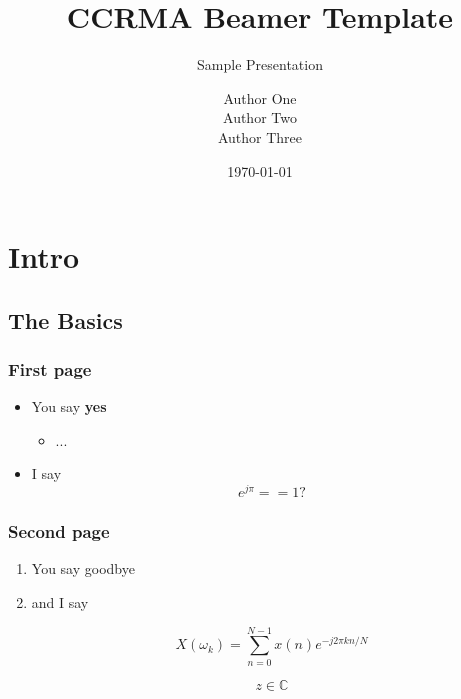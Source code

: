 \documentclass{beamer}
\title{CCRMA Beamer Template}
\subtitle{Sample Presentation}
\author{Author One \\ Author Two \\ Author Three}
\date
\institute[CCRMA]{
    CCRMA\\
    Department of Music\\
    Stanford University%
}
\date{\today}
\begin{document}
\begin{frame}[plain]
    \titlepage
\end{frame}
\addtocounter{framenumber}{-1}  %


\begin{frame}[plain]
    \tableofcontents
\end{frame}
\addtocounter{framenumber}{-1}  %

\section[Intro]{Intro}
\begin{frame}[plain]
    \tableofcontents[currentsection]
\end{frame}
\addtocounter{framenumber}{-1}  %

\subsection[basics]{The Basics}

\begin{frame}\frametitle{First page}
    \begin{itemize}
    \item You say \textbf{yes}
        \begin{itemize}
        \item ...
        \end{itemize}
    \item I say \\
    \begin{equation*}
    e^{j \pi} == 1?
    \end{equation*}
    \end{itemize}

\end{frame}

\begin{frame}\frametitle{Second page}
    \begin{enumerate}
    \item You say goodbye
    \item and I say

    \begin{equation}
    X(\omega_k) = \sum_{n=0}^{N-1}x(n)e^{-j2\pi kn/N}
    \end{equation}

    \begin{equation}
    z \in \mathbb{C}
    \end{equation}

    \end{enumerate}
\end{frame}
\end{document}
